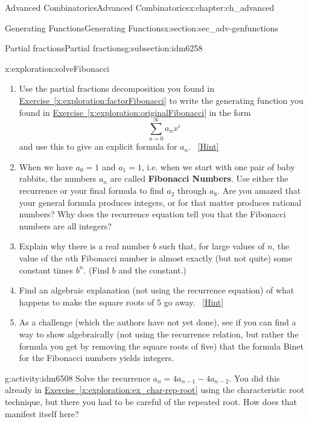 \documentclass[oneside,10pt,]{book}
\newcommand{\terminology}[1]{\textbf{#1}}
\numberwithin{equation}{chapter}
\begin{document}
\begin{chapterptx}{Advanced Combinatorics}{}{Advanced Combinatorics}{}{}{x:chapter:ch_advanced}
\begin{sectionptx}{Generating Functions}{}{Generating Functions}{}{}{x:section:sec_adv-genfunctions}
\begin{subsectionptx}{Partial fractions}{}{Partial fractions}{}{}{g:subsection:idm6258}
\begin{exploration}{}{x:exploration:solveFibonacci}%
\begin{enumerate}[font=\bfseries,label=(\alph*),ref=\alph*]
\item{}Use the partial fractions decomposition you found in \hyperref[x:exploration:factorFibonacci]{Exercise~\ref{x:exploration:factorFibonacci}} to write the generating function you found in \hyperref[x:exploration:originalFibonacci]{Exercise~\ref{x:exploration:originalFibonacci}} in the form%
\begin{equation*}
\sum_{n=0}^\infty a_nx^i
\end{equation*}
and use this to give an explicit formula for \(a_n\).%
\qquad~\hfill{\tiny\hyperlink{g:hint:idm6431-back}{[Hint]}}\item{}When we have \(a_0=1\) and \(a_1=1\), i.e. when we start with one pair of baby rabbits, the numbers \(a_n\) are called \terminology{Fibonacci Numbers}.  Use either the recurrence or your final formula to find \(a_2\) through \(a_8\).  Are you amazed that your general formula produces integers, or for that matter produces rational numbers?  Why does the recurrence equation tell you that the Fibonacci numbers are all integers?%
\item{}Explain why there is a real number \(b\) such that, for large values of \(n\), the value of the \(n\)th Fibonacci number is almost exactly (but not quite) some constant times \(b^n\). (Find \(b\) and the constant.)%
\item{}Find an algebraic explanation (not using the recurrence equation) of what happens to make the square roots of 5 go away.%
\qquad~\hfill{\tiny\hyperlink{g:hint:idm6490-back}{[Hint]}}\item{}As a challenge (which the authors have not yet done), see if you can find a way to show algebraically (not using the recurrence relation, but rather the formula you get by removing the square roots of five) that the formula Binet for the Fibonacci numbers yields integers.%
\end{enumerate}
\end{exploration}
\begin{activity}{}{g:activity:idm6508}%
Solve the recurrence \(a_n= 4a_{n-1} - 4a_{n-2}\).  You did this already in \hyperref[x:exploration:ex_char-rep-root]{Exercise~\ref{x:exploration:ex_char-rep-root}} using the characteristic root technique, but there you had to be careful of the repeated root.  How does that manifest itself here?%
\end{activity}

\end{subsectionptx}
\end{sectionptx}
\end{chapterptx}
\end{document}
